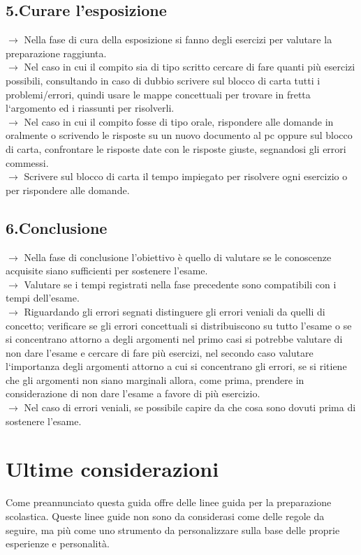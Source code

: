 \documentclass[11pt,a4paper]{article}
\begin{document}
\subsection{5.Curare l'esposizione}
$\rightarrow$ Nella fase di cura della esposizione si fanno degli esercizi per valutare la preparazione raggiunta.\\
$\rightarrow$ Nel caso in cui il compito sia di tipo scritto cercare di fare quanti più esercizi possibili, consultando in caso di dubbio scrivere sul blocco di carta tutti i problemi/errori, quindi usare le mappe concettuali per trovare in fretta l`argomento ed i riassunti per risolverli.\\
$\rightarrow$ Nel caso in cui il compito fosse di tipo orale, rispondere alle domande in oralmente o scrivendo le risposte su un nuovo documento al pc oppure sul blocco di carta,  confrontare le risposte date con le risposte giuste, segnandosi gli errori commessi.\\
$\rightarrow$ Scrivere sul blocco di carta il tempo impiegato per risolvere ogni esercizio o per rispondere alle domande.\\

\subsection{6.Conclusione}
$\rightarrow$ Nella fase di conclusione l'obiettivo è quello di valutare se le conoscenze acquisite siano sufficienti per sostenere l'esame. \\
$\rightarrow$ Valutare se i tempi registrati nella fase precedente sono compatibili con i tempi dell'esame.\\
$\rightarrow$ Riguardando gli errori segnati distinguere gli errori veniali da quelli di concetto; verificare se gli errori concettuali si distribuiscono su tutto l'esame o se si concentrano attorno a degli argomenti  nel primo casi si potrebbe valutare di non dare l'esame e cercare di fare più esercizi, nel secondo caso valutare l`importanza degli argomenti attorno a cui si concentrano gli errori, se si ritiene che gli argomenti non siano marginali allora, come prima, prendere in considerazione di non dare l'esame a favore di più esercizio.\\
$\rightarrow$ Nel caso di errori veniali, se possibile capire da che cosa sono dovuti prima di sostenere l'esame.\\

\section{Ultime considerazioni}
Come preannunciato questa guida offre delle linee guida per la preparazione scolastica. Queste linee guide non sono da considerasi come delle regole da seguire, ma più come uno strumento da personalizzare sulla base delle proprie esperienze e personalità. \\
	
\end{document}
